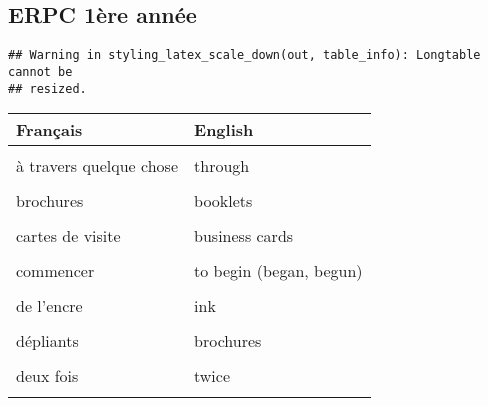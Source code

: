 \documentclass[
  10pt,
]{article}
\begin{document}
\hypertarget{erpc-1uxe8re-annuxe9e}{%
\subsection{ERPC 1ère année}\label{erpc-1uxe8re-annuxe9e}}

\begin{verbatim}
## Warning in styling_latex_scale_down(out, table_info): Longtable cannot be
## resized.
\end{verbatim}

\begin{longtable}{ll}
\toprule
Français & English\\
\midrule
\cellcolor{gray!6}{alimenter} & \cellcolor{gray!6}{to feed (fed, fed)}\\

à travers quelque chose & through\\

\cellcolor{gray!6}{autocollants} & \cellcolor{gray!6}{stickers}\\

brochures & booklets\\

\cellcolor{gray!6}{bye} & \cellcolor{gray!6}{au revoir}\\

cartes de visite & business cards\\

\cellcolor{gray!6}{charger} & \cellcolor{gray!6}{to load}\\

commencer & to begin (began, begun)\\

\cellcolor{gray!6}{de la poudre} & \cellcolor{gray!6}{powder}\\

de l'encre & ink\\

\cellcolor{gray!6}{de l'huile} & \cellcolor{gray!6}{oil}\\

dépliants & brochures\\

\cellcolor{gray!6}{des agrafes} & \cellcolor{gray!6}{staples}\\

deux fois & twice\\

\cellcolor{gray!6}{dos carré-collé} & \cellcolor{gray!6}{perfect binding}\\


\end{longtable}
\end{document}
